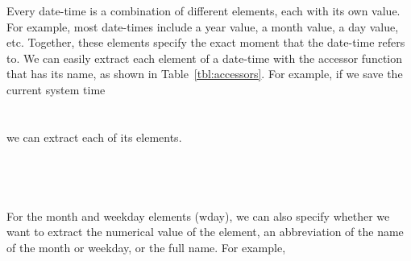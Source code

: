 \documentclass[article]{jss}
\begin{document}
Every date-time is a combination of different elements, each with its own value. For example, most date-times include a year value, a month value, a day value, etc. Together, these elements specify the exact moment that the date-time refers to. We can easily extract each element of a date-time with the accessor function that has its name, as shown in Table~\ref{tbl:accessors}. For example,  if we save the current system time\\

\\
\\

we can extract each of its elements.\\

\\
\\

\\
\\

For the month and weekday elements (wday), we can also specify whether we want to extract the numerical value of the element, an abbreviation of the name of the month or weekday, or the full name. For example,

\\
\\

\\
\\

\\
\\

\\
\\
\end{document}
